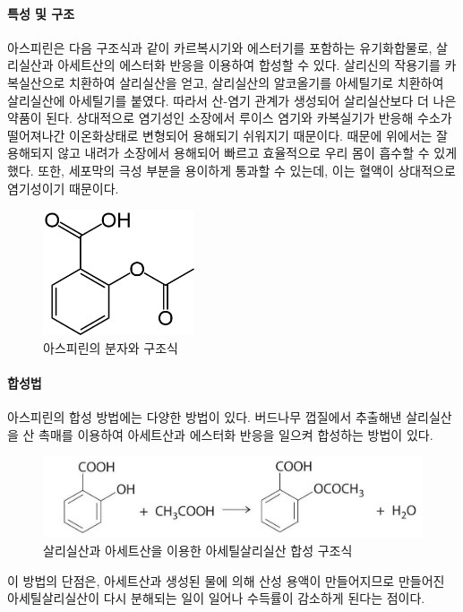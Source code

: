 \documentclass{GSHS-chemexp}
\begin{document}
	\paragraph{특성 및 구조}
	아스피린은 다음 구조식과 같이 카르복시기와 에스터기를 포함하는 유기화합물로, 살리실산과 아세트산의 에스터화 반응을 이용하여 합성할 수 있다. 살리신의 작용기를 카복실산으로 치환하여 살리실산을 얻고, 살리실산의 알코올기를 아세틸기로 치환하여 살리실산에 아세틸기를 붙였다. 따라서 산-염기 관계가 생성되어 살리실산보다 더 나은 약품이 된다. 상대적으로 염기성인 소장에서 루이스 염기와 카복실기가 반응해 수소가 떨어져나간 이온화상태로 변형되어 용해되기 쉬워지기 때문이다. 때문에 위에서는 잘 용해되지 않고 내려가 소장에서 용해되어 빠르고 효율적으로 우리 몸이 흡수할 수 있게 했다. 또한, 세포막의 극성 부분을 용이하게 통과할 수 있는데, 이는 혈액이 상대적으로 염기성이기 때문이다.
	\begin{figure}[H]
		\centering
		\includegraphics[height=10em]{Aspirin-skeletal.png}
		\caption{아스피린의 분자와 구조식}
		\label{fig:asp_ske}
	\end{figure}
	
	\paragraph{합성법}
	아스피린의 합성 방법에는 다양한 방법이 있다.
	버드나무 껍질에서 추출해낸 살리실산을 산 촉매를 이용하여
	아세트산과 에스터화 반응을 일으켜 합성하는 방법이 있다.
	\begin{figure}[H]
		\centering
		\includegraphics[width=\textwidth]{averillfwk-eq14_005_2.jpg}
		\caption{살리실산과 아세트산을 이용한 아세틸살리실산 합성 구조식}
		\label{fig:asp_form1}
	\end{figure}
	
	이 방법의 단점은, 아세트산과 생성된 물에 의해 산성 용액이 만들어지므로
	만들어진 아세틸살리실산이 다시 분해되는 일이 일어나
	수득률이 감소하게 된다는 점이다.
	
\end{document}
